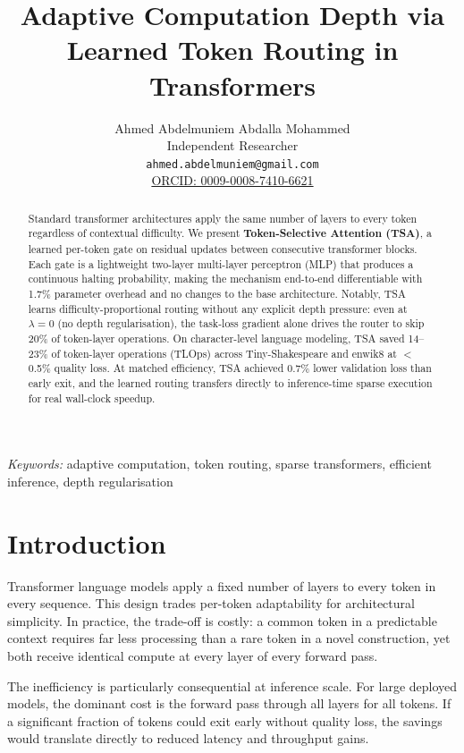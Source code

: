 \documentclass{article}
\title{Adaptive Computation Depth via Learned Token Routing in Transformers}
\author{%
  Ahmed Abdelmuniem Abdalla Mohammed \\
  Independent Researcher \\
  \texttt{ahmed.abdelmuniem@gmail.com} \\
  \href{https://orcid.org/0009-0008-7410-6621}{ORCID: 0009-0008-7410-6621}
}
\newcommand{\tsa}{TSA\xspace}
\newcommand{\tlops}{TLOps\xspace}
\begin{document}
\maketitle

\begin{abstract}
Standard transformer architectures apply the same number of layers to every token
regardless of contextual difficulty. We present \textbf{Token-Selective Attention
(TSA)}, a learned per-token gate on residual updates between consecutive transformer
blocks. Each gate is a lightweight two-layer multi-layer perceptron (MLP) that produces a continuous halting
probability, making the mechanism end-to-end differentiable with 1.7\% parameter
overhead and no changes to the base architecture. Notably, \tsa learns
difficulty-proportional routing without any explicit depth pressure: even at
$\lambda{=}0$ (no depth regularisation), the task-loss gradient alone drives the
router to skip 20\% of token-layer operations. On character-level language modeling,
\tsa saved 14--23\% of token-layer operations (\tlops) across Tiny-Shakespeare and
enwik8 at $<$0.5\% quality loss. At matched efficiency, \tsa achieved 0.7\% lower
validation loss than early exit, and the learned routing transfers directly to
inference-time sparse execution for real wall-clock speedup.
\end{abstract}

\vspace{0.5em}
\noindent\textit{Keywords:} adaptive computation, token routing, sparse transformers, efficient inference, depth regularisation

\section{Introduction}

Transformer language models \citep{vaswani2017attention} apply a fixed number of
layers to every token in every sequence. This design trades per-token adaptability
for architectural simplicity. In practice, the trade-off is costly: a common token in
a predictable context requires far less processing than a rare token in a novel
construction, yet both receive identical compute at every layer of every forward pass.

The inefficiency is particularly consequential at inference scale. For large deployed
models, the dominant cost is the forward pass through all layers for all tokens. If a
significant fraction of tokens could exit early without quality loss, the savings
would translate directly to reduced latency and throughput gains.
\end{document}
